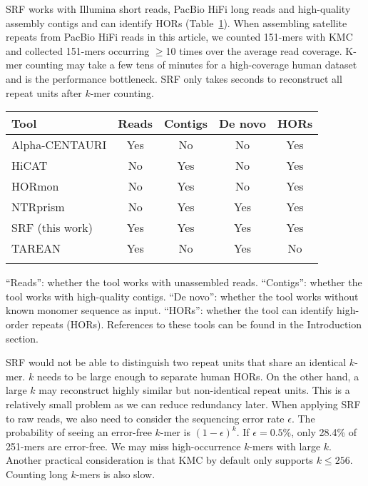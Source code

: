\documentclass{bioinfo}
\newcommand{\revised}[1]{{\color{blue}#1}}
\begin{document}
SRF works with Illumina short reads, PacBio HiFi long reads and high-quality
assembly contigs and can identify HORs (Table~\ref{tab:tool}).  When assembling
satellite repeats from PacBio HiFi reads in this article, we counted 151-mers
with KMC~\citep{Kokot:2017aa} and collected 151-mers occurring $\ge$10 times
over the average read coverage. K-mer counting may take a few tens of minutes
for a high-coverage human dataset and is the performance bottleneck. SRF only
takes seconds to reconstruct all repeat units after $k$-mer counting.

\begin{table}[!hb]
{\label{tab:tool}
\begin{tabular}{p{3.6cm}cccc}
\toprule
Tool & Reads & Contigs & De novo & HORs \\
\midrule
Alpha-CENTAURI & Yes & No & No & Yes \\
HiCAT    & No & Yes & No & Yes \\
HORmon   & No & Yes & No & Yes \\
NTRprism & No & Yes & Yes  & Yes \\
SRF (this work) & Yes & Yes & Yes  & Yes \\
TAREAN   & Yes& No  & Yes  & No \\
\botrule
\end{tabular}}{``Reads'': whether the tool works with unassembled reads.
``Contigs'': whether the tool works with high-quality contigs. ``De novo'':
whether the tool works without known monomer sequence as input. ``HORs'':
whether the tool can identify high-order repeats (HORs). References to these
tools can be found in the Introduction section.}
\end{table}

\revised{SRF would not be able to distinguish two repeat units that share an
identical $k$-mer. $k$ needs to be large enough to separate human HORs. On the
other hand, a large $k$ may reconstruct highly similar but non-identical repeat
units. This is a relatively small problem as we can reduce redundancy later.
When applying SRF to raw reads, we also need to consider the sequencing error rate
$\epsilon$. The probability of seeing an error-free $k$-mer is $(1-\epsilon)^k$.
If $\epsilon=0.5\%$, only 28.4\% of 251-mers are error-free.  We may miss
high-occurrence $k$-mers with large $k$. Another practical consideration is
that KMC by default only supports $k\le256$. Counting long $k$-mers is also
slow.}
\end{document}
